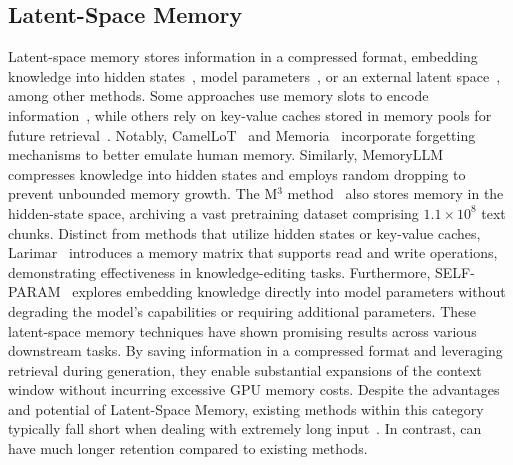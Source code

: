 \subsection{Latent-Space Memory}
Latent-space memory stores information in a compressed format, embedding knowledge into hidden states~\citep{kNNLM, memoryllm}, model parameters~\citep{self-param}, or an external latent space~\citep{larimar}, among other methods. Some approaches use memory slots to encode information~\citep{al2021memory}, while others rely on key-value caches stored in memory pools for future retrieval~\citep{MemoringTransformers, LongMEM, he2024camelot, Memoria}. Notably, CamelLoT~\citep{he2024camelot} and Memoria~\citep{Memoria} incorporate forgetting mechanisms to better emulate human memory. Similarly, MemoryLLM~\citep{memoryllm} compresses knowledge into hidden states and employs random dropping to prevent unbounded memory growth. The M$^3$ method~\citep{memory3} also stores memory in the hidden-state space, archiving a vast pretraining dataset comprising $1.1\times 10^8$ text chunks. Distinct from methods that utilize hidden states or key-value caches, Larimar~\citep{larimar} introduces a memory matrix that supports read and write operations, demonstrating effectiveness in knowledge-editing tasks. Furthermore, SELF-PARAM~\citep{self-param} explores embedding knowledge directly into model parameters without degrading the model's capabilities or requiring additional parameters. These latent-space memory techniques have shown promising results across various downstream tasks. By saving information in a compressed format and leveraging retrieval during generation, they enable substantial expansions of the context window without incurring excessive GPU memory costs.
Despite the advantages and potential of Latent-Space Memory, existing methods within this category typically fall short when dealing with extremely long input~\citep{larimar,self-param,memoryllm,he2024camelot}. In contrast, \ours can have much longer retention compared to existing methods.


